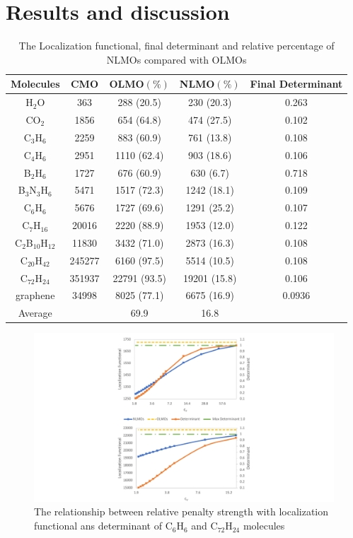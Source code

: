 \documentclass[aps,prl,reprint,amsmath,amssymb]{revtex4-1}
\begin{document}
\section{Results and discussion}
\begin{table}[ht]
\caption{The Localization functional, final determinant and relative percentage of NLMOs compared with OLMOs}
\centering
\begin{tabular}{c c c c c}
\hline\hline
Molecules & CMO &  OLMO$(\%)$ & NLMO$(\%)$ & Final Determinant \\
\hline
H$_2$O & 363 & 288 (20.5) & 230 (20.3) & 0.263 \\ 
CO$_2$ & 1856 & 654 (64.8) & 474 (27.5) & 0.102 \\
C$_3$H$_6$ & 2259 & 883 (60.9) & 761 (13.8) & 0.108 \\
C$_4$H$_6$ & 2951 & 1110 (62.4) & 903 (18.6) & 0.106 \\
B$_2$H$_6$ & 1727 & 676 (60.9) & 630 (6.7) & 0.718 \\
B$_3$N$_3$H$_6$ & 5471 & 1517 (72.3)  & 1242 (18.1) & 0.109  \\
C$_6$H$_6$  & 5676 & 1727 (69.6) & 1291 (25.2) & 0.107 \\ 
C$_7$H$_{16}$ & 20016 & 2220 (88.9) & 1953 (12.0) & 0.122 \\ 
C$_2$B$_{10}$H$_{12}$ & 11830 & 3432 (71.0) & 2873 (16.3) & 0.108 \\ 
C$_{20}$H$_{42}$ & 245277 & 6160 (97.5) & 5514 (10.5) & 0.108 \\ 
C$_{72}$H$_{24}$ & 351937 & 22791 (93.5) & 19201 (15.8) & 0.106 \\ 
graphene & 34998 & 8025 (77.1) & 6675 (16.9) & 0.0936 \\
Average & & 69.9 & 16.8 & \\
\hline
\end{tabular}
\label{table:nonlin}
\end{table}

\begin{figure}[htbp]
\includegraphics[scale=0.65]{figure_1.pdf} 
  \caption{The relationship between relative penalty strength with  localization functional ans determinant of C$_6$H$_6$ and C$_{72}$H$_{24}$ molecules}
\end{figure}
\end{document}
